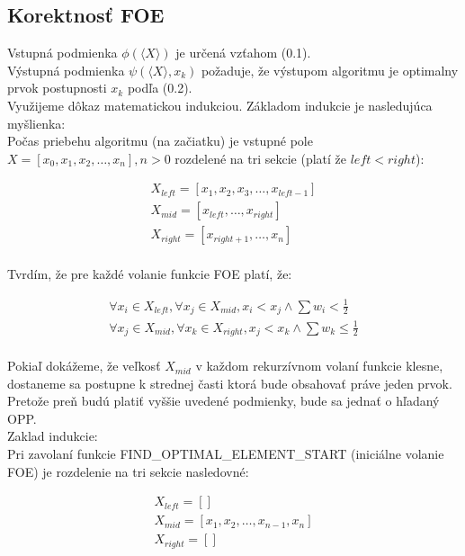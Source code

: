 \documentclass[paper=a4, fontsize=11pt]{scrartcl} %
\numberwithin{equation}{section} %
\numberwithin{figure}{section} %
\numberwithin{table}{section} %
\begin{document}
\subsection*{Korektnosť FOE}
Vstupná podmienka $\phi(\langle X \rangle)$ je určená vzťahom (0.1).\\
Výstupná podmienka $\psi(\langle X \rangle, x_k)$ požaduje, že výstupom algoritmu je optimalny prvok postupnosti $x_k$ podľa (0.2). \\
Využijeme dôkaz matematickou indukciou. Základom indukcie je nasledujúca myšlienka: \\
Počas priebehu algoritmu (na začiatku) je vstupné pole $X = [x_0, x_1, x_2, \dots, x_n], n > 0$ rozdelené na tri sekcie (platí že $left < right$):

\begin{equation}
    \begin{aligned}
        X_{left} = [x_1, x_2, x_3, \dots, x_{left-1}] \\
        X_{mid} = [x_{left}, \dots, x_{right}] \\
        X_{right} = [x_{right+1}, \dots, x_n] \\
    \end{aligned}
\end{equation}

Tvrdím, že pre každé volanie funkcie FOE platí, že:

\begin{equation}
    \begin{aligned}
        \forall x_i \in X_{left}, \forall x_j \in X_{mid}, x_i < x_j \wedge \sum w_i < \frac{1}{2} \\
        \forall x_j \in X_{mid}, \forall x_k \in X_{right}, x_j < x_k \wedge \sum w_k \leq \frac{1}{2} \\
    \end{aligned}
\end{equation}

Pokiaľ dokážeme, že veľkosť $X_{mid}$ v každom rekurzívnom volaní funkcie klesne, dostaneme sa postupne k strednej časti ktorá bude obsahovať práve jeden prvok. Pretože preň budú platiť vyššie uvedené podmienky, bude sa jednať o hľadaný OPP. \\
Zaklad indukcie: \\
Pri zavolaní funkcie FIND\_OPTIMAL\_ELEMENT\_START (iniciálne volanie FOE) je rozdelenie na tri sekcie nasledovné:

\begin{equation}
    \begin{aligned}
        X_{left} = [] \\
        X_{mid} = [x_1, x_2, \dots, x_{n-1}, x_n] \\
        X_{right} = [] \\
    \end{aligned}
\end{equation}
\end{document}
